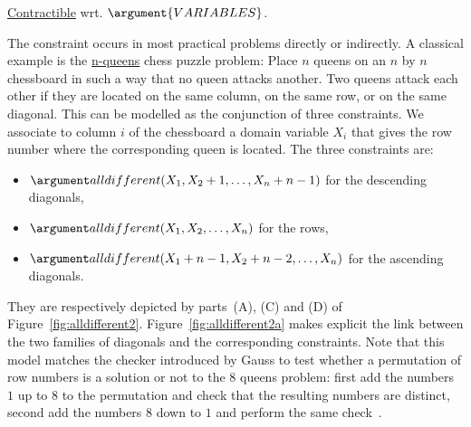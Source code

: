 \begin{ctrdesc}
{\begin{minipage}[t]{11.2cm}
\end{minipage}}
\item[\pdfmarkup{subject={Arg. properties},color=white,markup=Highlight}{Arg. properties}{Properties of some arguments of the constraint (e.g. Functional dependency: an argument is determined by some other arguments, Contractibility: can remove items from any position of a collection, Prefix-contractibility: can remove items from first position, Suffix-contractibility: can remove items from last position, Extensibility: can add items at any position of a collection, Prefix-extensibility: can add items before first position, Suffix-extensibility: can add items after last position).}]
\colorbox{MyAzurelight}{\begin{minipage}[t]{11.2cm}
\hyperlink{contractible}{Contractible} wrt. $\argument{VARIABLES}$.
\end{minipage}}
\item[\pdfmarkup{subject={Usage},color=white,markup=Highlight}{Usage}{Typical usage of the constraint.}]
The  constraint occurs in most practical problems
directly or indirectly. A classical example is the \hyperlink{n-queens}{n-queens}
chess puzzle problem:
Place $n$ queens on an $n$ by $n$ chessboard in such a way that no
queen attacks another. Two queens attack each other if they are
located on the same column, on the same row, or on the same diagonal.
This can be modelled as the conjunction of three
 constraints.
We associate to column $i$ of the chessboard a domain
variable $X_i$ that gives the row number where the corresponding
queen is located. The three  constraints are:
\begin{itemize}
\item
$\Malldifferent(X_1    ,X_2+1  ,\dots,X_n+n-1)$ for the descending diagonals,
\item
$\Malldifferent(X_1    ,X_2    ,\dots,X_n    )$ for the rows,
\item
$\Malldifferent(X_1+n-1,X_2+n-2,\dots,X_n    )$ for the ascending diagonals.
\end{itemize}
They are respectively depicted by parts~(A), (C) and (D) of Figure~\ref{fig:alldifferent2}.
Figure~\ref{fig:alldifferent2a} makes explicit the link between the two families of diagonals
and the corresponding  constraints.
Note that this model matches the checker introduced by Gauss to test whether a permutation
of row numbers is a solution or not to the $8$ queens problem: first add the numbers $1$ up to $8$ to the
permutation and check that the resulting numbers are distinct, second add the numbers $8$
down to $1$ and perform the same check~\cite[pages 165--166]{Watkins04}.


\end{ctrdesc}
